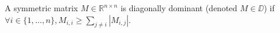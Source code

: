 \begin{definition}
\label{def:diagonally_dominant}
	A symmetric matrix $M\in\mathbb{R}^{n\times n}$ is diagonally dominant (denoted $M \in \DD$) if $\forall i\in\{1,\dots,n\}, M_{i,i} \geq \sum_{j\neq i} |M_{i,j}|$.
 \end{definition}